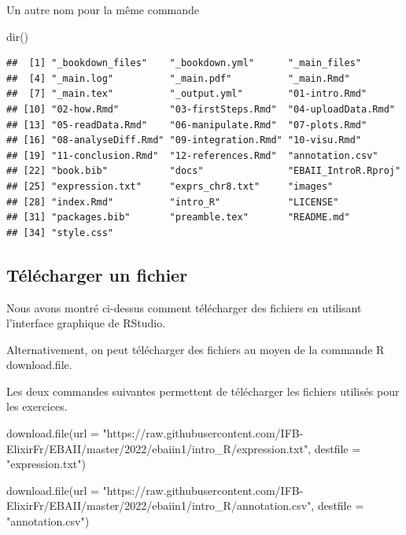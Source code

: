 \documentclass[
]{book}
\newenvironment{Shaded}{\begin{snugshade}}{\end{snugshade}}
\newcommand{\AttributeTok}[1]{\textcolor[rgb]{0.77,0.63,0.00}{#1}}
\newcommand{\FunctionTok}[1]{\textcolor[rgb]{0.00,0.00,0.00}{#1}}
\newcommand{\NormalTok}[1]{#1}
\newcommand{\StringTok}[1]{\textcolor[rgb]{0.31,0.60,0.02}{#1}}
\begin{document}
Un autre nom pour la même commande

\begin{Shaded}
\begin{Highlighting}[]
\FunctionTok{dir}\NormalTok{()}
\end{Highlighting}
\end{Shaded}

\begin{verbatim}
##  [1] "_bookdown_files"    "_bookdown.yml"      "_main_files"       
##  [4] "_main.log"          "_main.pdf"          "_main.Rmd"         
##  [7] "_main.tex"          "_output.yml"        "01-intro.Rmd"      
## [10] "02-how.Rmd"         "03-firstSteps.Rmd"  "04-uploadData.Rmd" 
## [13] "05-readData.Rmd"    "06-manipulate.Rmd"  "07-plots.Rmd"      
## [16] "08-analyseDiff.Rmd" "09-integration.Rmd" "10-visu.Rmd"       
## [19] "11-conclusion.Rmd"  "12-references.Rmd"  "annotation.csv"    
## [22] "book.bib"           "docs"               "EBAII_IntroR.Rproj"
## [25] "expression.txt"     "exprs_chr8.txt"     "images"            
## [28] "index.Rmd"          "intro_R"            "LICENSE"           
## [31] "packages.bib"       "preamble.tex"       "README.md"         
## [34] "style.css"
\end{verbatim}

\hypertarget{tuxe9luxe9charger-un-fichier}{%
\subsection{Télécharger un fichier}\label{tuxe9luxe9charger-un-fichier}}

Nous avons montré ci-dessus comment télécharger des fichiers en utilisant l'interface graphique de RStudio.

Alternativement, on peut télécharger des fichiers au moyen de la commande R download.file.

Les deux commandes suivantes permettent de télécharger les fichiers utilisés pour les exercices.

\begin{Shaded}
\begin{Highlighting}[]
\FunctionTok{download.file}\NormalTok{(}\AttributeTok{url =} \StringTok{"https://raw.githubusercontent.com/IFB{-}ElixirFr/EBAII/master/2022/ebaiin1/intro\_R/expression.txt"}\NormalTok{, }\AttributeTok{destfile =} \StringTok{"expression.txt"}\NormalTok{)}
\end{Highlighting}
\end{Shaded}

\begin{Shaded}
\begin{Highlighting}[]
\FunctionTok{download.file}\NormalTok{(}\AttributeTok{url =} \StringTok{"https://raw.githubusercontent.com/IFB{-}ElixirFr/EBAII/master/2022/ebaiin1/intro\_R/annotation.csv"}\NormalTok{, }\AttributeTok{destfile =} \StringTok{"annotation.csv"}\NormalTok{)}
\end{Highlighting}
\end{Shaded}
\end{document}
